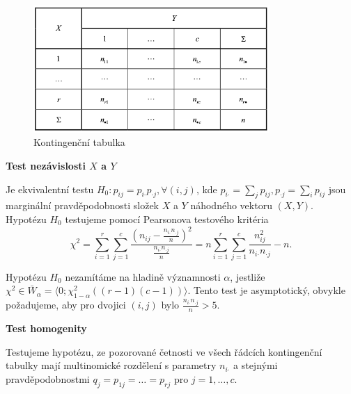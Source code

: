 \begin{figure}[H]
\centering
\includegraphics[width=0.8\textwidth]{Obrazky/kontingencni_tabulka.png}
\caption{Kontingenční tabulka}
\end{figure}

\textbf{Test nezávislosti $X$ a $Y$}

Je ekvivalentní testu $H_0: p_{ij} = p_{i \boldsymbol{\cdot}} p_{\boldsymbol{\cdot} j}, \forall (i,j)$, kde $p_{i \boldsymbol{\cdot}} = \sum_j p_{ij}, p_{\boldsymbol{\cdot} j} = \sum_i p_{ij}$ jsou marginální pravděpodobnosti složek $X$ a $Y$ náhodného vektoru $(X,Y)$. Hypotézu $H_0$ testujeme pomocí Pearsonova testového kritéria
\begin{equation*}
\chi^2 = \sum_{i = 1}^r \sum_{ j = 1}^c \frac{(n_{ij} - \frac{n_{i \boldsymbol{\cdot}} n_{\boldsymbol{\cdot} j}}{n})^2}{\frac{n_{i \boldsymbol{\cdot}} n_{\boldsymbol{\cdot} j}}{n}} = n \sum_{i = 1}^r \sum_{ j = 1}^c \frac{n_{ij}^2}{n_{i \boldsymbol{\cdot}} n_{\boldsymbol{\cdot} j}} - n.
\end{equation*}

Hypotézu $H_0$ nezamítáme na hladině významnosti $\alpha$, jestliže $\chi^2 \in \bar{W}_{\alpha} = \langle 0; \chi^2_{1 - \alpha} ((r - 1)(c - 1)) \rangle$. Tento test je asymptotický, obvykle požadujeme, aby pro dvojici $(i,j)$ bylo $\frac{n_{i \boldsymbol{\cdot}} n_{\boldsymbol{\cdot} j}}{n} > 5$.


\textbf{Test homogenity}

Testujeme hypotézu, ze pozorované četnosti ve všech řádcích kontingenční tabulky mají multinomické rozdělení s parametry $n_{i \boldsymbol{\cdot}}$ a stejnými pravděpodobnostmi $q_j = p_{1j} = \ldots = p_{rj}$ pro $j = 1, \ldots, c$.

